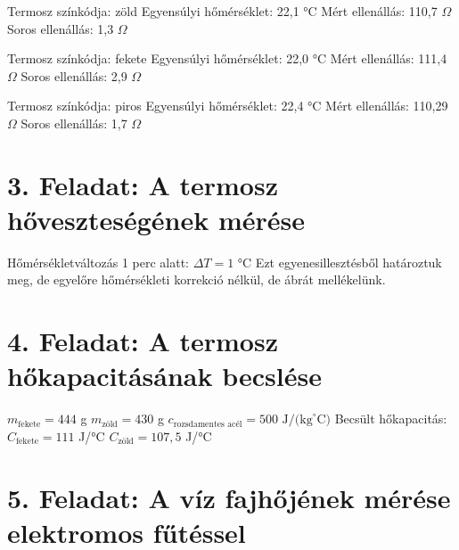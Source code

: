 \documentclass{article}
\begin{document}
Termosz színkódja: zöld
Egyensúlyi hőmérséklet: 22,1 °C
Mért ellenállás: 110,7 $\Omega$
Soros ellenállás: 1,3 $\Omega$

Termosz színkódja: fekete
Egyensúlyi hőmérséklet: 22,0 °C
Mért ellenállás: 111,4 $\Omega$
Soros ellenállás: 2,9 $\Omega$

Termosz színkódja: piros
Egyensúlyi hőmérséklet: 22,4 °C
Mért ellenállás: 110,29 $\Omega$
Soros ellenállás: 1,7 $\Omega$



\section*{3. Feladat: A termosz hőveszteségének mérése}

Hőmérsékletváltozás 1 perc alatt: $\Delta T=1$ °C
Ezt egyenesillesztésből határoztuk meg, de egyelőre hőmérsékleti korrekció nélkül, de ábrát mellékelünk.

\section*{4. Feladat: A termosz hőkapacitásának becslése}


$m_{\text{fekete}}=444$ g
$m_{\text{zöld}}=430$ g
$c_{\text{rozsdamentes acél}}=500 \text{ J/(kg}^{\circ}\text{C)}$
Becsült hőkapacitás: 
$C_{\text{fekete}}=111$ J/°C
$C_{\text{zöld}}=107,5$ J/°C

\section*{5. Feladat: A víz fajhőjének mérése elektromos fűtéssel}

\end{document}
